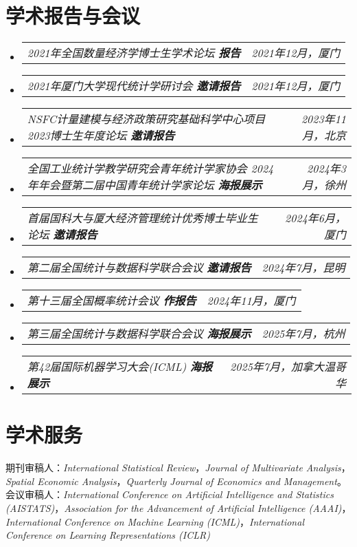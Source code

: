 \documentclass[letterpaper,10pt]{article}
\makeatletter
\newcommand{\resumeSubSubheading}[2]{
    \item
    \begin{tabular*}{0.97\textwidth}{l@{\extracolsep{\fill}}r}
      \textit{\small#1} & \textit{\small #2} \\
    \end{tabular*}\vspace{-7pt}
}
\newcommand{\resumeSubHeadingListStart}{\begin{itemize}[leftmargin=0.15in, label={}]}
\newcommand{\resumeSubHeadingListEnd}{\end{itemize}}
\makeatother
\begin{document}
\section{学术报告与会议}
\resumeSubHeadingListStart
    \resumeSubSubheading
        {{2021年全国数量经济学博士生学术论坛} \textbf{报告}}{2021年12月，厦门}
    \resumeSubSubheading
        {{2021年厦门大学现代统计学研讨会} \textbf{邀请报告}}{2021年12月，厦门}
    \resumeSubSubheading
        {{NSFC计量建模与经济政策研究基础科学中心项目2023博士生年度论坛} \textbf{邀请报告}}{2023年11月，北京}
    \resumeSubSubheading
        {{全国工业统计学教学研究会青年统计学家协会 2024 年年会暨第二届中国青年统计学家论坛} \textbf{海报展示}}{2024年3月，徐州}
    \resumeSubSubheading
        {{首届国科大与厦大经济管理统计优秀博士毕业生论坛} \textbf{邀请报告}}{2024年6月，厦门}
    \resumeSubSubheading
        {{第二届全国统计与数据科学联合会议} \textbf{邀请报告}}{2024年7月，昆明}
    \resumeSubSubheading
        {{第十三届全国概率统计会议} \textbf{作报告}}{2024年11月，厦门}
    \resumeSubSubheading
        {{第三届全国统计与数据科学联合会议} \textbf{海报展示}}{2025年7月，杭州}
    \resumeSubSubheading
        {{第42届国际机器学习大会(ICML)} \textbf{海报展示}}{2025年7月，加拿大温哥华}
\resumeSubHeadingListEnd


  \section{学术服务}
  期刊审稿人：\textit{International Statistical Review}，\textit{Journal of Multivariate Analysis}，\textit{Spatial Economic Analysis}，\textit{Quarterly Journal of Economics and Management}。\\
  会议审稿人：\textit{International Conference on Artificial Intelligence and Statistics (AISTATS)}，\textit{Association for the Advancement of Artificial Intelligence (AAAI)}，\textit{International Conference on Machine Learning (ICML)}，\textit{International Conference on Learning Representations (ICLR)}
\end{document}
